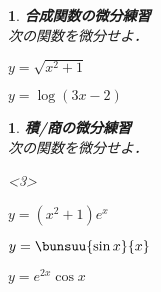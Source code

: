 \documentclass[10pt,
a4paper,
fleqn,
dvipdfmx,
uplatex
]{jsarticle}
\newtheorem{question}[Question]{}
\newcommand{\bqu}{\begin{tcolorbox}\vspace{0.5zw}\begin{question}}
\newcommand{\equ}{\end{question}\vspace{0.5zw}\end{tcolorbox}}
\newcommand{\benu}{\begin{enumerate}}
\newcommand{\eenu}{\end{enumerate}}
\newcommand{\beda}{\vspace{-1zw}\begin{edaenumerate}}
\newcommand{\eeda}{\end{edaenumerate}}
\newcommand{\bb}{\bf\boldmath}%
\newcommand{\sq}{\textstyle\sqrt}
\begin{document}
{%

\bqu{\bb 合成関数の微分練習}\\
次の関数を微分せよ．
\beda
\item $y=\sq{x^2+1}$
\item $y=\log(3x-2)$
\eeda
\equ



\bqu{\bb 積/商の微分練習}\\
次の関数を微分せよ．
\beda<3>
\item $y=(x^2+1)e^x$
\item $y=\bunsuu{\sin x}{x}$
\item $y=e^{2x}\cos x$
\eeda
\equ

}
\end{document}
